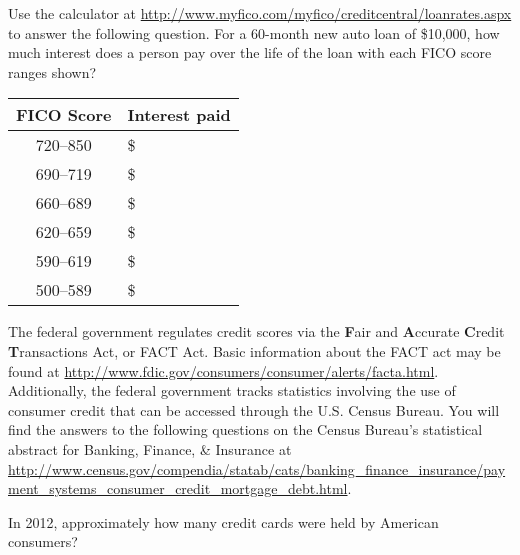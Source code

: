 \documentclass{ximera}
\begin{document}
\begin{question}
Use the calculator at \url{http://www.myfico.com/myfico/creditcentral/loanrates.aspx} to answer the following question. For a 60-month new auto loan of \$10,000, how much interest does a person pay over the life of the loan with each FICO score ranges shown?

\begin{free-response}
\begin{tabular}{@{}cl@{}}\toprule
 \textbf{FICO Score} & \textbf{Interest paid}\\\midrule
720--850 & \$\\
690--719 & \$\\
660--689 & \$\\
620--659 & \$\\
590--619 & \$\\
500--589 & \$\\
\bottomrule
\end{tabular}
\end{free-response}

\begin{comment}
\begin{solution}
\begin{expression-answer}
function validator(p) {
    if (p == 20)
      return 1;
    if (p == 0.2) {feedback( `What percentage does this value represent?')
    }
    if (p == 2) {feedback( `How would you represent $2\%$ as a decimal? Does this match your answer?')
    }
      return 0;
  }
\end{expression-answer}
\end{solution}
\end{comment}
\end{question}

The federal government regulates credit scores via the \textbf{F}air and \textbf{A}ccurate \textbf{C}redit \textbf{T}ransactions Act, or FACT Act. Basic information about the FACT act may be found at \url{http://www.fdic.gov/consumers/consumer/alerts/facta.html}. Additionally, the federal government tracks statistics involving the use of consumer credit that can be accessed through the U.S. Census Bureau. You will find the answers to the following questions on the Census Bureau's statistical abstract for Banking, Finance, \& Insurance at \url{http://www.census.gov/compendia/statab/cats/banking_finance_insurance/payment_systems_consumer_credit_mortgage_debt.html}.


\begin{question}
In 2012, approximately how many credit cards were held by American consumers?
  \begin{solution}
    \begin{multiple-choice}
    \end{multiple-choice}
  \end{solution}
\end{question}
\end{document}
